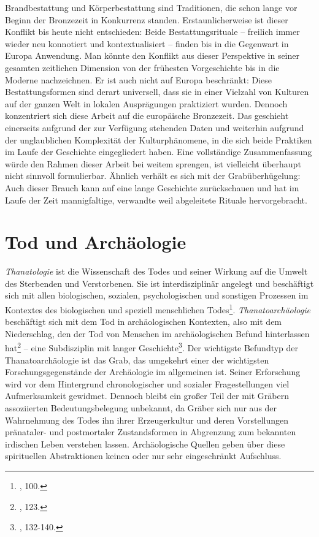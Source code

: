 \documentclass[openany,twoside,twocolumn]{book}
\let\rmarkdownfootnote\footnote%
\def\footnote{\protect\rmarkdownfootnote}
\begin{document}
Brandbestattung und Körperbestattung sind Traditionen, die schon lange
vor Beginn der Bronzezeit in Konkurrenz standen. Erstaunlicherweise ist
dieser Konflikt bis heute nicht entschieden: Beide Bestattungsrituale --
freilich immer wieder neu konnotiert und kontextualisiert -- finden bis
in die Gegenwart in Europa Anwendung. Man könnte den Konflikt aus dieser
Perspektive in seiner gesamten zeitlichen Dimension von der frühesten
Vorgeschichte bis in die Moderne nachzeichnen. Er ist auch nicht auf
Europa beschränkt: Diese Bestattungsformen sind derart universell, dass
sie in einer Vielzahl von Kulturen auf der ganzen Welt in lokalen
Ausprägungen praktiziert wurden. Dennoch konzentriert sich diese Arbeit
auf die europäische Bronzezeit. Das geschieht einerseits aufgrund der
zur Verfügung stehenden Daten und weiterhin aufgrund der unglaublichen
Komplexität der Kulturphänomene, in die sich beide Praktiken im Laufe
der Geschichte eingegliedert haben. Eine vollständige Zusammenfassung
würde den Rahmen dieser Arbeit bei weitem sprengen, ist vielleicht
überhaupt nicht sinnvoll formulierbar. Ähnlich verhält es sich mit der
Grabüberhügelung: Auch dieser Brauch kann auf eine lange Geschichte
zurückschauen und hat im Laufe der Zeit mannigfaltige, verwandte weil
abgeleitete Rituale hervorgebracht.

\hypertarget{death-and-archaeology}{%
\section{Tod und Archäologie}\label{death-and-archaeology}}

\emph{Thanatologie} ist die Wissenschaft des Todes und seiner Wirkung
auf die Umwelt des Sterbenden und Verstorbenen. Sie ist interdisziplinär
angelegt und beschäftigt sich mit allen biologischen, sozialen,
psychologischen und sonstigen Prozessen im Kontextes des biologischen
und speziell menschlichen Todes\footnote{\textcite{hofmann_rituelle_2008},
  100.}. \emph{Thanatoarchäologie} beschäftigt sich mit dem Tod in
archäologischen Kontexten, also mit dem Niederschlag, den der Tod von
Menschen im archäologischen Befund hinterlassen hat\footnote{\textcite{hofmann_rituelle_2008},
  123.} -- eine Subdisziplin mit langer Geschichte\footnote{\textcite{hofmann_rituelle_2008},
  132-140.}. Der wichtigste Befundtyp der Thanatoarchäologie ist das
Grab, das umgekehrt einer der wichtigsten Forschungsgegenstände der
Archäologie im allgemeinen ist. Seiner Erforschung wird vor dem
Hintergrund chronologischer und sozialer Fragestellungen viel
Aufmerksamkeit gewidmet. Dennoch bleibt ein großer Teil der mit Gräbern
assoziierten Bedeutungsbelegung unbekannt, da Gräber sich nur aus der
Wahrnehmung des Todes ihn ihrer Erzeugerkultur und deren Vorstellungen
pränataler- und postmortaler Zustandsformen in Abgrenzung zum bekannten
irdischen Leben verstehen lassen. Archäologische Quellen geben über
diese spirituellen Abstraktionen keinen oder nur sehr eingeschränkt
Aufschluss.
\end{document}
